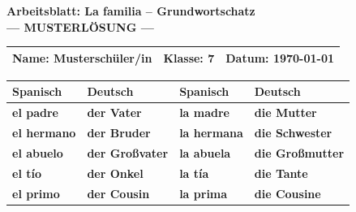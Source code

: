 \documentclass[11pt, a4paper]{article}
\newcommand{\fachfarbe}{spanisch}
\newcommand{\thema}{La familia -- Grundwortschatz}
\newcommand{\klasse}{7}
\newcommand{\datum}{\today}
\newcommand{\loesung}[1]{\textcolor{loesung}{\textbf{#1}}}
\newcommand{\es}[1]{\textcolor{\fachfarbe}{\textbf{#1}}}
\begin{document}
\begin{center}
    {\Large\bfseries\textcolor{\fachfarbe}{Arbeitsblatt: \thema}}\\[0.3em]
    {\large\textcolor{loesung}{\textbf{--- MUSTERLÖSUNG ---}}}
\end{center}

\vspace{5pt}

\noindent
\begin{tabularx}{\textwidth}{|X|X|X|}
\hline
\textbf{Name:} \textcolor{loesung}{Musterschüler/in} &
\textbf{Klasse:} \klasse &
\textbf{Datum:} \datum \\
\hline
\end{tabularx}

\vspace{15pt}


\begin{merkkasten}

\begin{center}
\begin{tabular}{|l|l||l|l|}
\hline
\textbf{Spanisch} & \textbf{Deutsch} & \textbf{Spanisch} & \textbf{Deutsch} \\
\hline
\es{el padre} & \loesung{der Vater} & \es{la madre} & \loesung{die Mutter} \\
\hline
\es{el hermano} & \loesung{der Bruder} & \es{la hermana} & \loesung{die Schwester} \\
\hline
\es{el abuelo} & \loesung{der Großvater} & \es{la abuela} & \loesung{die Großmutter} \\
\hline
\es{el tío} & \loesung{der Onkel} & \es{la tía} & \loesung{die Tante} \\
\hline
\es{el primo} & \loesung{der Cousin} & \es{la prima} & \loesung{die Cousine} \\
\hline
\end{tabular}
\end{center}

\end{merkkasten}

\vspace{10pt}

\end{document}
